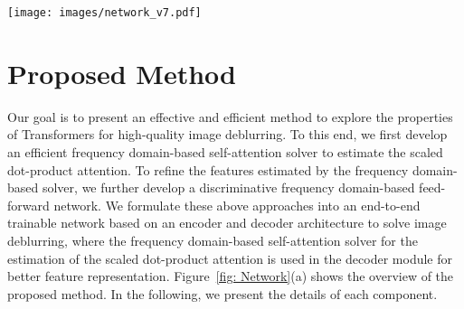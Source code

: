 \documentclass[10pt,twocolumn,letterpaper]{article}
\begin{document}
\begin{figure*}[thbp]
    \centering
 \texttt{[image: images/network\_v7.pdf]}
 \vspace{-1mm}
 \caption{Network architectures. (a) The proposed asymmetric encoder-decoder network that only contains DFFN in the encoder module and both FSAS and DFFN in the decoder module for image deblurring. (b) The proposed FSAS module. (c) The proposed DFFN module.}
 \label{fig: Network}
 \vspace{-4mm}
\end{figure*}



\section{Proposed Method}

Our goal is to present an effective and efficient method to explore the properties of Transformers for high-quality image deblurring.
To this end, we first develop an efficient frequency domain-based self-attention solver to estimate the scaled dot-product attention. To refine the features estimated by the frequency domain-based solver, we further develop a discriminative frequency domain-based feed-forward network.
We formulate these above approaches into an end-to-end trainable network based on an encoder and decoder architecture to solve image deblurring, where the frequency domain-based self-attention solver for the estimation of the scaled dot-product attention is used in the decoder module for better feature representation.
Figure~\ref{fig: Network}(a) shows the overview of the proposed method. In the following, we present the details of each component.
\end{document}
